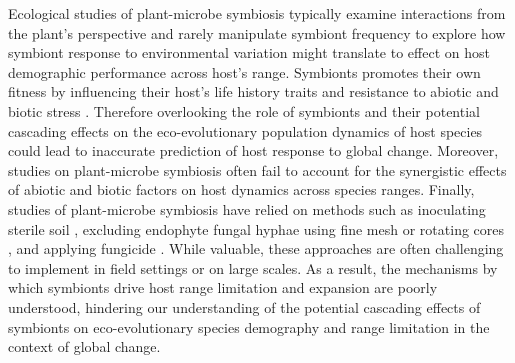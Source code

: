 \documentclass[11pt]{article}
\begin{document}
Ecological studies of plant-microbe symbiosis typically examine interactions from the plant’s perspective and rarely manipulate symbiont frequency to explore how symbiont response to environmental variation might translate to effect on host demographic performance across host's range.
Symbionts  promotes their own fitness by influencing their host's life history traits and resistance to abiotic and biotic stress \citep{kazenel2015mutualistic,giauque2019endophyte,saikkonen1998fungal}. 
Therefore overlooking the role of symbionts and their potential cascading effects on the eco-evolutionary population dynamics of host species  could lead to inaccurate prediction of host response to global change. 
Moreover, studies on plant-microbe symbiosis often fail to account for  the synergistic effects of abiotic and biotic factors on host dynamics across species ranges.
Finally, studies of plant-microbe symbiosis have relied on methods  such as inoculating sterile soil \citep{peacher2020inoculum}, excluding endophyte fungal hyphae using fine mesh or rotating cores \citep{chung2019connecting}, and applying fungicide \citep{bennett2022costs}. 
While valuable, these approaches are often challenging to implement in field settings or on large scales.
As a result, the mechanisms by which symbionts drive host range limitation and expansion are poorly understood, hindering our understanding of the potential cascading effects of symbionts on eco-evolutionary species demography and  range limitation in the context of global change.

\end{document}

